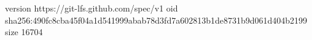 version https://git-lfs.github.com/spec/v1
oid sha256:490fc8cba45f04a1d541999abab78d3fd7a602813b1de8731b9d061d404b2199
size 16704
